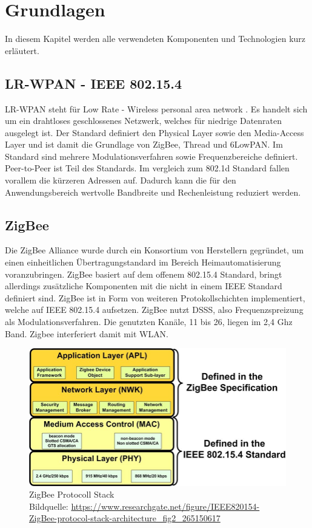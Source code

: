 \chapter{Grundlagen}

In diesem Kapitel werden alle verwendeten Komponenten und Technologien kurz erläutert.

\section{LR-WPAN - IEEE 802.15.4}

LR-WPAN steht für \grqq Low Rate - Wireless personal area network \grqq{}. Es handelt sich um ein drahtloses geschlossenes Netzwerk, welches für 
niedrige Datenraten ausgelegt ist. Der Standard definiert den Physical Layer sowie den Media-Access Layer und ist damit die Grundlage von ZigBee, Thread und 6LowPAN.
Im Standard sind mehrere Modulationsverfahren sowie Frequenzbereiche definiert. Peer-to-Peer ist Teil des Standards. Im vergleich zum 802.1d Standard fallen 
vorallem die kürzeren Adressen auf. Dadurch kann die für den Anwendungsbereich wertvolle Bandbreite und Rechenleistung reduziert werden. 

\section{ZigBee}

Die ZigBee Alliance wurde durch ein Konsortium von Herstellern gegründet, um einen einheitlichen Übertragungstandard
im Bereich Heimautomatisierung voranzubringen. ZigBee basiert auf dem offenem 802.15.4 Standard, bringt allerdings zusätzliche Komponenten mit die nicht in einem IEEE
Standard definiert sind.
ZigBee ist in Form von weiteren Protokollschichten implementiert, welche auf IEEE 802.15.4 aufsetzen. ZigBee nutzt DSSS, also Frequenzspreizung als Modulationsverfahren.
Die genutzten Kanäle, 11 bis 26, liegen im 2,4 Ghz Band. Zigbee interferiert damit mit WLAN.

\begin{figure}[H]
  \centering
  \includegraphics[width=1\textwidth]{media/Zigbee Stack.jpg}
  \caption{ZigBee Protocoll Stack \\ Bildquelle: \url{https://www.researchgate.net/figure/IEEE820154-ZigBee-protocol-stack-architecture_fig2_265150617}}
\end{figure}


